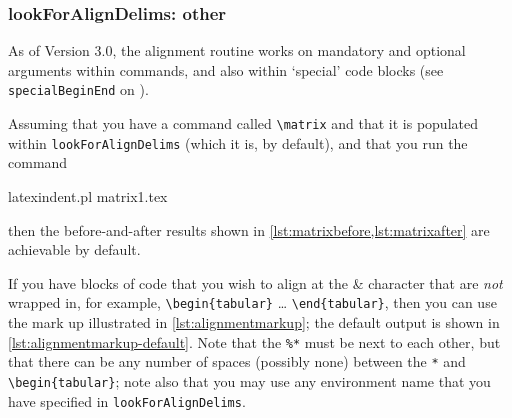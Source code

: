 \subsubsection{lookForAlignDelims: other}
 As of Version 3.0, the alignment routine works on mandatory and optional arguments
 within commands, and also within `special' code blocks (see \texttt{specialBeginEnd} on
 ).

 \begin{example}
 Assuming that you have a command called \lstinline!\matrix! and that it is populated
 within \texttt{lookForAlignDelims} (which it is, by default), and that you run the
 command

 \begin{commandshell}
latexindent.pl matrix1.tex 
\end{commandshell}

 then the before-and-after results shown in \cref{lst:matrixbefore,lst:matrixafter} are
 achievable by default.

 \begin{cmhtcbraster}
 \end{cmhtcbraster}
 \end{example}

 If you have blocks of code that you wish to align at the \& character that are
 \emph{not} wrapped in, for example, \lstinline!\begin{tabular}! \ldots
 \lstinline!\end{tabular}!, then you can use the mark up illustrated in
 \cref{lst:alignmentmarkup}; the default output is shown in
 \cref{lst:alignmentmarkup-default}. Note that the \lstinline!%*! must be next to each
 other, but that there can be any number of spaces (possibly none) between the
 \lstinline!*! and \lstinline!\begin{tabular}!; note also that you may use any
 environment name that you have specified in \texttt{lookForAlignDelims}.

 \begin{cmhtcbraster}[raster left skip=-1.5cm,]
 \end{cmhtcbraster}

